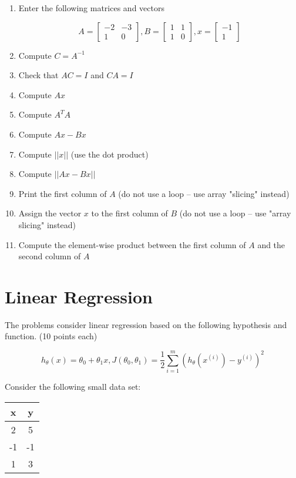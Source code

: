\documentclass{article}
\begin{document}
\begin{enumerate}
    \item Enter the following matrices and vectors 

    $$
    A=\begin{bmatrix}
-2 & -3 \\
1 & 0
\end{bmatrix}, B= \begin{bmatrix}
1 & 1 \\
1 & 0
\end{bmatrix}, x= \begin{bmatrix}
-1 \\
1
\end{bmatrix}
    $$
    
\item Compute $C=A^{-1}$
\item Check that $AC=I$ and $CA=I$
\item Compute $Ax$
\item Compute $A^T A$
\item Compute $Ax-Bx$
\item Compute $||x||$ (use the dot product)
\item Compute $||Ax-Bx||$
\item Print the first column of $A$ (do not use a loop -- use array "slicing" instead)
\item Assign the vector $x$ to the first column of $B$ (do not use a loop -- use "array slicing" instead)
\item Compute the element-wise product between the first column of $A$ and the second column of $A$
\end{enumerate}

\section{Linear Regression}

The problems consider linear regression based on  
the following hypothesis and function. (10 points each)

$$h_{\theta} (x)=\theta_0 +\theta_1 x, 
J(\theta_0, \theta_1)=\frac{1}{2} \sum_{i=1}^m (h_{\theta} (x^{(i)}) - y^{(i)})^2
$$

{\noindent} Consider the following small data set:

\begin{center}
\begin{tabular}{ c c }
x & y\\
 \hline
 2  & 5 \\
 -1 & -1 \\
 1 & 3
\end{tabular}
\end{center}
\end{document}
